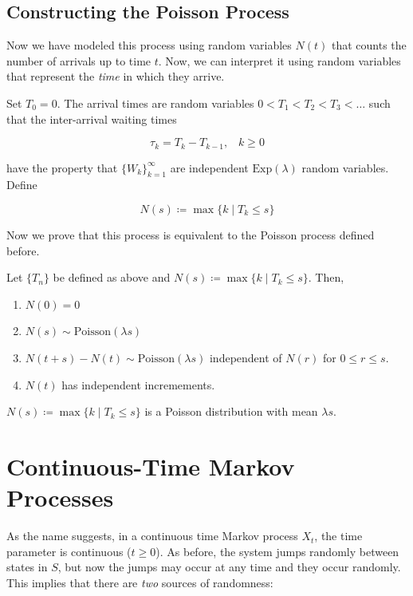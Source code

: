 \documentclass{article}
\begin{document}
  \subsection{Constructing the Poisson Process}

    Now we have modeled this process using random variables $N(t)$ that counts the number of arrivals up to time $t$. Now, we can interpret it using random variables that represent the \textit{time} in which they arrive. 

    \begin{definition}
      Set $T_0 = 0$. The arrival times are random variables $0 < T_1 < T_2 < T_3 < \ldots$ such that the inter-arrival waiting times

        \[\tau_k = T_k - T_{k-1}, \;\;\; k \geq 0\]

      have the property that $\{W_k\}_{k=1}^\infty$ are independent $\mathrm{Exp}(\lambda)$ random variables. Define 

        \[N(s) \coloneqq \max\{k \mid T_k \leq s \}\]
    \end{definition}

    Now we prove that this process is equivalent to the Poisson process defined before. 

    \begin{theorem}
      Let $\{T_n\}$ be defined as above and $N(s) \coloneqq \max\{k \mid T_k \leq s \}$. Then, 

      \begin{enumerate}
        \item $N(0) = 0$
        \item $N(s) \sim \mathrm{Poisson}(\lambda s)$ 
        \item $N(t + s) - N(t) \sim \mathrm{Poisson}(\lambda s)$ independent of $N(r)$ for $0 \leq r \leq s$. 
        \item $N(t)$ has independent incremements. 
      \end{enumerate}

      $N(s) \coloneqq \max\{k \mid T_k \leq s \}$ is a Poisson distribution with mean $\lambda s$. 
    \end{theorem}

\section{Continuous-Time Markov Processes}

  As the name suggests, in a continuous time Markov process $X_t$, the time parameter is continuous ($t \geq 0$). As before, the system jumps randomly between states in $S$, but now the jumps may occur at any time and they occur randomly. This implies that there are \textit{two} sources of randomness:
\end{document}

